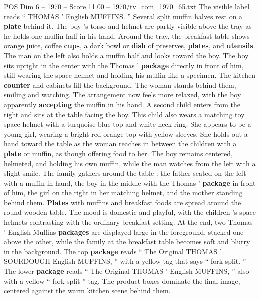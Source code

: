 \begin{textsample}{POS Dim 6 – 1970 – Score 11.00 – 1970/tv\_com\_1970\_65.txt}
The visible label reads “ THOMAS ’ English MUFFINS. ” Several split muffin halves rest on a \textbf{plate} behind it.
The boy ’s torso and helmet are partly visible above the tray as he holds one muffin half in his hand.
Around the tray, the breakfast table shows orange juice, coffee \textbf{cups}, a dark bowl or \textbf{dish} of preserves, \textbf{plates}, and \textbf{utensils}.
The man on the left also holds a muffin half and looks toward the boy.
The boy sits upright in the center with the Thomas ’ \textbf{package} directly in front of him, still wearing the space helmet and holding his muffin like a specimen.
The kitchen \textbf{counter} and cabinets fill the background.
The woman stands behind them, smiling and watching.
The arrangement now feels more relaxed, with the boy apparently \textbf{accepting} the muffin in his hand.
A second child enters from the right and sits at the table facing the boy.
This child also wears a matching toy space helmet with a turquoise-blue top and white neck ring.
She appears to be a young girl, wearing a bright red-orange top with yellow sleeves.
She holds out a hand toward the table as the woman reaches in between the children with a \textbf{plate} or muffin, as though offering food to her.
The boy remains centered, helmeted, and holding his own muffin, while the man watches from the left with a slight smile.
The family gathers around the table : the father seated on the left with a muffin in hand, the boy in the middle with the Thomas ’ \textbf{package} in front of him, the girl on the right in her matching helmet, and the mother standing behind them. \textbf{Plates} with muffins and breakfast foods are spread around the round wooden table.
The mood is domestic and playful, with the children ’s space helmets contrasting with the ordinary breakfast setting.
At the end, two Thomas ’ English Muffins \textbf{packages} are displayed large in the foreground, stacked one above the other, while the family at the breakfast table becomes soft and blurry in the background.
The top \textbf{package} reads “ The Original THOMAS ’ SOURDOUGH English MUFFINS, ” with a yellow tag that says “ fork-split. ” The lower \textbf{package} reads “ The Original THOMAS ’ English MUFFINS, ” also with a yellow “ fork-split ” tag.
The product boxes dominate the final image, centered against the warm kitchen scene behind them.

\end{textsample}
